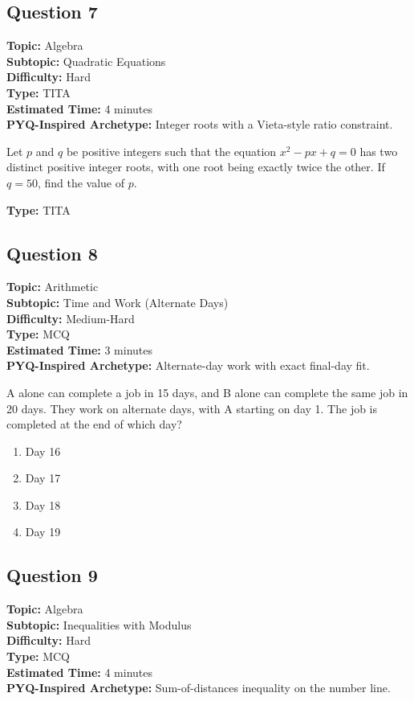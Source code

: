 \documentclass[11pt]{article}
\begin{document}
\subsection*{Question 7}
\textbf{Topic:} Algebra \\
\textbf{Subtopic:} Quadratic Equations \\
\textbf{Difficulty:} Hard \\
\textbf{Type:} TITA \\
\textbf{Estimated Time:} 4 minutes \\
\textbf{PYQ-Inspired Archetype:} Integer roots with a Vieta-style ratio constraint.

\begin{tcolorbox}
Let \(p\) and \(q\) be positive integers such that the equation \(x^2 - p x + q = 0\) has two distinct positive integer roots, with one root being exactly twice the other. If \(q = 50\), find the value of \(p\).
\end{tcolorbox}
\textbf{Type:} TITA

\subsection*{Question 8}
\textbf{Topic:} Arithmetic \\
\textbf{Subtopic:} Time and Work (Alternate Days) \\
\textbf{Difficulty:} Medium-Hard \\
\textbf{Type:} MCQ \\
\textbf{Estimated Time:} 3 minutes \\
\textbf{PYQ-Inspired Archetype:} Alternate-day work with exact final-day fit.

\begin{tcolorbox}
A alone can complete a job in 15 days, and B alone can complete the same job in 20 days. They work on alternate days, with A starting on day 1. The job is completed at the end of which day?
\end{tcolorbox}
\begin{enumerate}[label=(\Alph*)]
\item Day 16 \quad
\item Day 17 \quad
\item Day 18 \quad
\item Day 19
\end{enumerate}

\subsection*{Question 9}
\textbf{Topic:} Algebra \\
\textbf{Subtopic:} Inequalities with Modulus \\
\textbf{Difficulty:} Hard \\
\textbf{Type:} MCQ \\
\textbf{Estimated Time:} 4 minutes \\
\textbf{PYQ-Inspired Archetype:} Sum-of-distances inequality on the number line.
\end{document}
